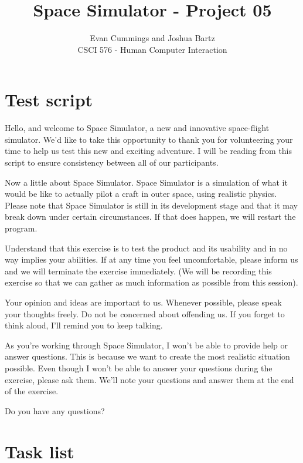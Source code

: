 
\DeclareMathOperator*{\argmax}{arg\,max}


\small

\title{Space Simulator - Project 05}
\author{Evan Cummings and Joshua Bartz\\
CSCI 576 - Human Computer Interaction}

\maketitle

\section{Test script}

Hello, and welcome to Space Simulator, a new and innovative space-flight simulator.  We'd like to take this opportunity to thank you for volunteering your time to help us test this new and exciting adventure.  I will be reading from this script to ensure consistency between all of our participants.

Now a little about Space Simulator.  Space Simulator is a simulation of what it would be like to actually pilot a craft in outer space, using realistic physics.  Please note that Space Simulator is still in its development stage and that it may break down under certain circumstances.  If that does happen, we will restart the program. 
  
Understand that this exercise is to test the product and its usability and in no way implies your abilities.  If at any time you feel uncomfortable, please inform us and we will terminate the exercise immediately. (We will be recording this exercise so that we can gather as much information as possible from this session).
   
Your opinion and ideas are important to us.  Whenever possible, please speak your thoughts freely.  Do not be concerned about offending us.  If you forget to think aloud, I'll remind you to keep talking. 
    
As you’re working through Space Simulator, I won’t be able to provide help or answer questions.  This is because we want to create the most realistic situation possible.  Even though I won't be able to answer your questions during the exercise, please ask them. We'll note your questions and answer them at the end of the exercise. 
     
Do you have any questions? 

\section{Task list}

